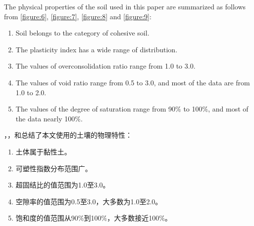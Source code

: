 \begin{paracol}{2}
    
    The physical properties of the soil used in this paper are summarized as follows from \autoref{figure:6}, \autoref{figure:7}, \autoref{figure:8} and \autoref{figure:9}: 

    \begin{enumerate}
        \item Soil belongs to the category of cohesive soil.
        \item The plasticity index has a wide range of distribution.
        \item The values of overconsolidation ratio range from 1.0 to 3.0.
        \item The values of void ratio range from 0.5 to 3.0, and most of the data are from 1.0 to 2.0.
        \item The values of the degree of saturation range from 90$\%$ to 100$\%$, and most of the data nearly 100$\%$.
    \end{enumerate}

    \switchcolumn

    ，，和总结了本文使用的土壤的物理特性：
    \begin{enumerate}
        \item 土体属于黏性土。
        \item 可塑性指数分布范围广。
        \item 超固结比的值范围为1.0至3.0。
        \item 空隙率的值范围为0.5至3.0，大多数为1.0至2.0。
        \item 饱和度的值范围从90$\%$到100$\%$，大多数接近100$\%$。
    \end{enumerate}

\end{paracol}